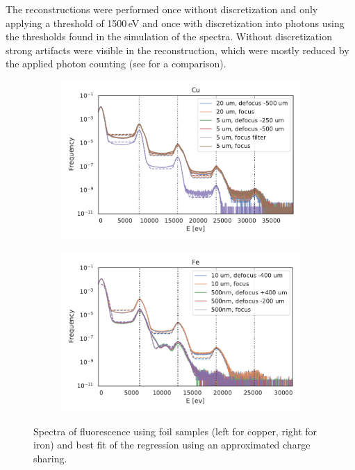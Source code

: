 The reconstructions were performed once without discretization and only applying a threshold of 1500\,eV and once with discretization into photons using the thresholds found in the simulation of the spectra. Without discretization strong artifacts were visible in the reconstruction, which were mostly reduced by the applied photon counting (see  for a comparison).

\begin{figure}
	\centering
	\begin{subfigure}[b]{0.45\textwidth}
		\includegraphics[width=\linewidth]{images/spectrum_foil_cu.pdf}
	\end{subfigure}
	\begin{subfigure}[b]{0.45\textwidth}
		\includegraphics[width=\linewidth]{images/spectrum_foil_fe.pdf}
	\end{subfigure}
	\caption[Spectra of fluorescence using foil samples ]{Spectra of fluorescence using foil samples (left for copper, right for iron) and best fit of the regression using an approximated charge sharing.}
	\label{fig:spectrafoil}
\end{figure}



